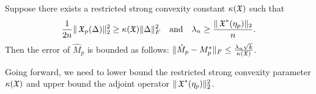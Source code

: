 


\begin{lemma}
\label{lem:lowRank}
Suppose there exists a restricted strong convexity constant $\kappa(\operatorname{\mathfrak{X}})$ such that
$$\frac{1}{2n} \| \operatorname{\mathfrak{X}}_p( \Delta )\|_2^2 \ge \kappa(\operatorname{\mathfrak{X}}) \|\Delta\|^2_F \quad \text{and} \quad
\lambda_n \ge \frac{\|\operatorname{\mathfrak{X}}^*(\eta_p)\|_2}{n}.$$
Then the error of $\hat M_p$ is bounded as follows:
$\| \hat M_p - M_p^* \|_F \le \frac{\lambda_n \sqrt{k}}{\kappa(\operatorname{\mathfrak{X}})}$.
\end{lemma}

Going forward, we need to lower bound the restricted strong convexity
parameter $\kappa(\operatorname{\mathfrak{X}})$ and upper bound the adjoint operator
$\|\operatorname{\mathfrak{X}}^*(\eta_p)\|_{2}^2$.


